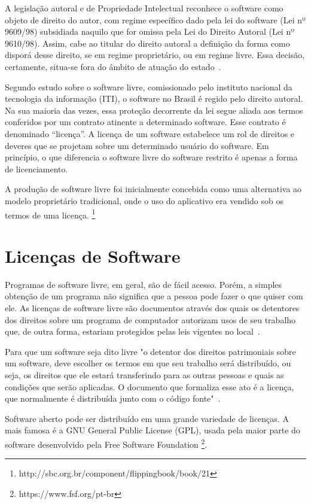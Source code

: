 A legislação autoral e de Propriedade Intelectual reconhece o software como objeto 
de direito do autor, com regime específico dado pela lei do software (Lei nº 9609/98)
subsidiada naquilo que for omissa pela Lei do Direito Autoral (Lei nº 9610/98).
%
Assim, cabe ao titular do direito autoral a definição da forma como disporá desse
direito, se em regime proprietário, ou em regime livre. Essa decisão, certamente,
situa-se fora do âmbito de atuação do estado~\cite{junior2005software}.

Segundo estudo sobre o software livre, comissionado pelo instituto nacional da 
tecnologia da informação (ITI), o software no Brasil é regido pelo direito autoral. 
Na sua maioria das vezes, essa proteção decorrente da lei segue aliada aos termos 
conferidos por um contrato atinente a determinado software. Esse contrato é 
denominado “licença”. A licença de um software estabelece um rol de direitos e 
deveres que se projetam sobre um determinado usuário do software. Em princípio, 
o que diferencia o software livre do software restrito é apenas a forma de
licenciamento. \cite{kon2012software}

A produção de software livre foi inicialmente concebida como
uma alternativa ao modelo proprietário tradicional, onde o uso
do aplicativo era vendido sob os termos de uma licença. \footnote{http://sbc.org.br/component/flippingbook/book/21}


\section{Licenças de Software}

Programas de software livre, em geral, são de fácil acesso. Porém, a simples obtenção
de um programa não significa que a pessoa pode fazer o que quiser com ele. As licenças
de software livre são documentos através dos quais os detentores dos direitos sobre um
programa de computador autorizam usos de seu trabalho que, de outra forma, estariam
protegidos pelas leis vigentes no local~\cite{sabino2009licenccas}.

Para que um software seja dito livre "o detentor dos direitos patrimoniais 
sobre um software, deve escolher os termos em que seu trabalho será distribuído, 
ou seja, os direitos que ele estará transferindo para as outras pessoas e quais as 
condições que serão aplicadas. O documento que formaliza esse ato é a licença, 
que normalmente é distribuída junto com o código fonte"~\cite{sabino2009licenccas}.

Software aberto pode ser distribuído em uma grande variedade de licenças.
A mais famosa é a GNU General Public License (GPL), usada pela maior
parte do software desenvolvido pela Free Software Foundation \footnote{https://www.fsf.org/pt-br}.

